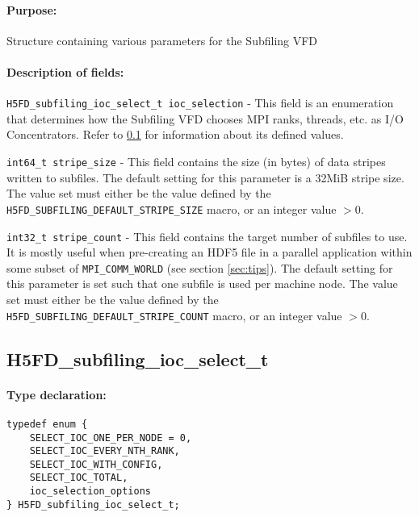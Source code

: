\documentclass[../main.tex]{subfiles}
\begin{document}
\paragraph{Purpose:}
\begin{flushleft}%
Structure containing various parameters for the Subfiling VFD
\end{flushleft}%

\paragraph{Description of fields:}
\begin{flushleft}%
\texttt{H5FD\_subfiling\_ioc\_select\_t ioc\_selection} - This field is an enumeration that
determines how the Subfiling VFD chooses MPI ranks, threads, etc. as I/O Concentrators. Refer
to \ref{ref:h5fd_subfiling_ioc_select_t} for information about its defined values.

\texttt{int64\_t stripe\_size} - This field contains the size (in bytes) of data stripes
written to subfiles. The default setting for this parameter is a 32MiB stripe size. The value
set must either be the value defined by the \texttt{H5FD\_SUBFILING\_DEFAULT\_STRIPE\_SIZE}
macro, or an integer value $> 0$.

\texttt{int32\_t stripe\_count} - This field contains the target number of subfiles to use.
It is mostly useful when pre-creating an HDF5 file in a parallel application within some
subset of \texttt{MPI\_COMM\_WORLD} (see section \ref{sec:tips}). The default setting for
this parameter is set such that one subfile is used per machine node. The value set must
either be the value defined by the \texttt{H5FD\_SUBFILING\_DEFAULT\_STRIPE\_COUNT} macro,
or an integer value $> 0$.
\end{flushleft}%

\newpage

\subsection{H5FD\_subfiling\_ioc\_select\_t}
\label{ref:h5fd_subfiling_ioc_select_t}

\paragraph{Type declaration:}
\begin{flushleft}%
\begin{verbatim}
typedef enum {
    SELECT_IOC_ONE_PER_NODE = 0,
    SELECT_IOC_EVERY_NTH_RANK,
    SELECT_IOC_WITH_CONFIG,
    SELECT_IOC_TOTAL,
    ioc_selection_options
} H5FD_subfiling_ioc_select_t;
\end{verbatim}
\end{flushleft}%
\end{document}
